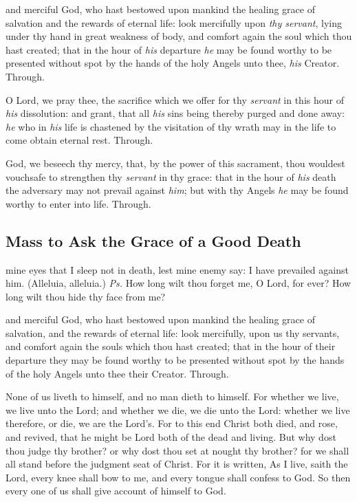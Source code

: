 \collect
{} and merciful God, who hast bestowed upon mankind the healing grace of salvation and the rewards of eternal life: look mercifully upon \emph{thy servant}, lying under thy hand in great weakness of body, and comfort again the soul which thou hast created; that in the hour of \emph{his} departure \emph{he} may be found worthy to be presented without spot by the hands of the holy Angels unto thee, \emph{his} Creator. Through.

\secret
{} O Lord, we pray thee, the sacrifice which we offer for thy \emph{servant} in this hour of \emph{his} dissolution: and grant, that all \emph{his} sins being thereby purged and done away: \emph{he} who in \emph{his} life is chastened by the visitation of thy wrath may in the life to come obtain eternal rest. Through.

\postcommunion
{} God, we beseech thy mercy, that, by the power of this sacrament, thou wouldest vouchsafe to strengthen thy \emph{servant} in thy grace: that in the hour of \emph{his} death the adversary may not prevail against \emph{him}; but with thy Angels \emph{he} may be found worthy to enter into life. Through.


\clearpage
\subsection{Mass to Ask the Grace of a Good Death}

\introit
{} mine eyes that I sleep not in death, lest mine enemy say: I have prevailed against him. (Alleluia, alleluia.) \textit{Ps.} How long wilt thou forget me, O Lord, for ever? How long wilt thou hide thy face from me?

\collect
{} and merciful God, who hast bestowed upon mankind the healing grace of salvation, and the rewards of eternal life: look mercifully, upon us thy servants, and comfort again the souls which thou hast created; that in the hour of their departure they may be found worthy to be presented without spot by the hands of the holy Angels unto thee their Creator. Through.

 None of us liveth to himself, and no man dieth to himself. For whether we live, we live unto the Lord; and whether we die, we die unto the Lord: whether we live therefore, or die, we are the Lord's. For to this end Christ both died, and rose, and revived, that he might be Lord both of the dead and living. But why dost thou judge thy brother? or why dost thou set at nought thy brother? for we shall all stand before the judgment seat of Christ. For it is written, As I live, saith the Lord, every knee shall bow to me, and every tongue shall confess to God. So then every one of us shall give account of himself to God.

